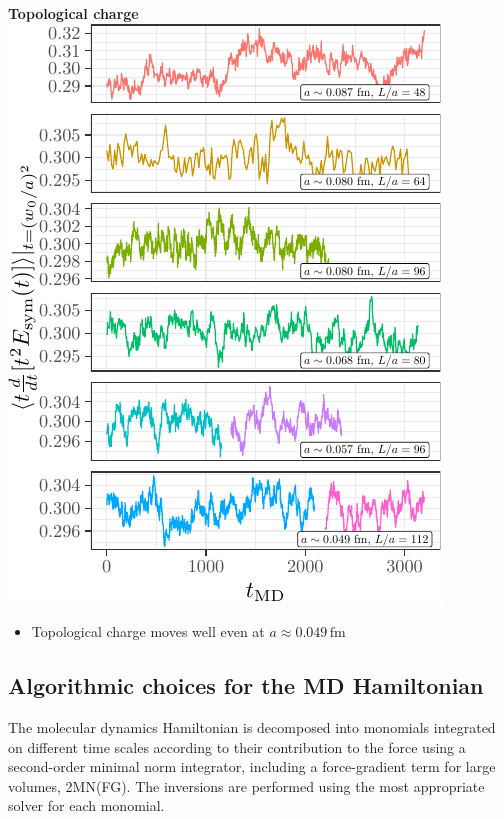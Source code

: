 \documentclass[a0,portrait]{a0poster}
\begin{document}
\begin{multicols}{2}
\begin{minipage}{0.48\linewidth}
        \centering
        \textbf{\hspace{3cm}Topological charge}\\
        \includegraphics[width=\linewidth,page=2]{data/gf_observables/gf_observables_md_histories}
        \begin{itemize}
            \item Topological charge moves well even at $a\approx 0.049 \, \mathrm{fm}$
        \end{itemize}
    \end{minipage}

    \subsection*{Algorithmic choices for the MD Hamiltonian}
    \noindent The molecular dynamics Hamiltonian is decomposed into monomials integrated on different time scales according to their contribution to the force using a second-order minimal norm integrator, including a force-gradient term for large volumes, 2MN(FG). The inversions are performed using the most appropriate solver for each monomial.
    \vspace{0.5cm}


\end{multicols}
\end{document}
